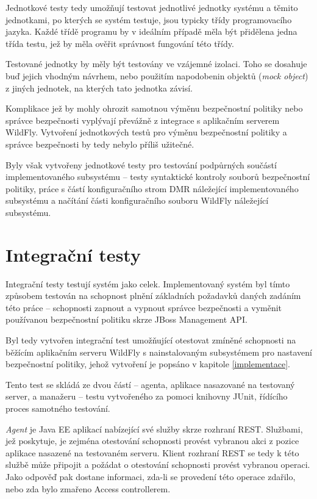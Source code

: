 Jednotkové testy tedy umožňují testovat jednotlivé jednotky systému a těmito jednotkami, po kterých se systém testuje, jsou typicky třídy programovacího jazyka. Každé třídě programu by v ideálním případě měla být přidělena jedna třída testu, jež by měla ověřit správnost fungování této třídy. \cite{ivsTest}

Testované jednotky by měly být testovány ve vzájemné izolaci. Toho se dosahuje buď jejich vhodným návrhem, nebo použitím napodobenin objektů ({\it mock object}) z jiných jednotek, na kterých tato jednotka závisí. \cite{ivsTest}

Komplikace jež by mohly ohrozit samotnou výměnu bezpečnostní politiky nebo správce bezpečnosti vyplývají převážně z integrace s aplikačním serverem WildFly. Vytvoření jednotkových testů pro výměnu bezpečnostní politiky a správce bezpečnosti by tedy nebylo příliš užitečné.

Byly však vytvořeny jednotkové testy pro testování podpůrných součástí implementovaného subsystému -- testy syntaktické kontroly souborů bezpečnostní politiky, práce s částí konfiguračního strom DMR náležející implementovaného subsystému a načítání části konfiguračního souboru WildFly náležející subsystému.

\section{Integrační testy}

Integrační testy testují systém jako celek. Implementovaný systém byl tímto způsobem testován na schopnost plnění základních požadavků daných zadáním této práce -- schopnosti zapnout a vypnout správce bezpečnosti a vyměnit používanou bezpečnostní politiku skrze JBoss Management API.

Byl tedy vytvořen integrační test umožňující otestovat zmíněné schopnosti na běžícím aplikačním serveru WildFly s nainstalovaným subsystémem pro nastavení bezpečnostní politiky, jehož vytvoření je popsáno v kapitole \ref{implementace}.

Tento test se skládá ze dvou částí -- agenta, aplikace nasazované na testovaný server, a manažeru -- testu vytvořeného za pomoci knihovny JUnit, řídícího proces samotného testování.

{\it Agent} je Java EE aplikací nabízející své služby skrze rozhraní REST. Službami, jež poskytuje, je zejména otestování schopnosti provést vybranou akci z pozice aplikace nasazené na testovaném serveru. Klient rozhraní REST se tedy k této službě může připojit a požádat o otestování schopnosti provést vybranou operaci. Jako odpověď pak dostane informaci, zda-li se provedení této operace zdařilo, nebo zda bylo zmařeno Access controllerem.

